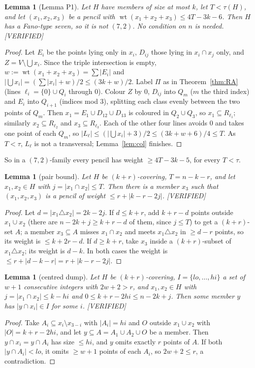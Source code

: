 \documentclass[11pt]{article}
\newtheorem{lemma}[theorem]{Lemma}
\theoremstyle{definition}
\newcommand{\st}[1]{\textsf{\small[#1]}}
\newcommand{\wt}{\operatorname{wt}}
\begin{document}
\begin{lemma}[Lemma P1]\label{lem:P1}
Let $H$ have members of size at most $k$, let $T<\tau(H)$, and let $(x_1,x_2,x_3)$ be a pencil with
$\wt(x_1+x_2+x_3)\le4T-3k-6$. Then $H$ has a Fano-type seven, so it is not $(7,2)$. No condition on $n$ is needed.
\st{VERIFIED}
\end{lemma}
\begin{proof}
Let $E_i$ be the points lying only in $x_i$, $D_{ij}$ those lying in $x_i\cap x_j$ only, and $Z=V\setminus\bigcup x_i$.
Since the triple intersection is empty, $w:=\wt(x_1+x_2+x_3)=\sum|E_i|$ and
$|\bigcup x_i|=(\sum|x_i|+w)/2\le(3k+w)/2$. Label $\Pi$ as in Theorem~\ref{thm:RA} (lines $\ell_i=\{0\}\cup Q_i$
through $0$). Colour $Z$ by $0$, $D_{ij}$ into $Q_m$ ($m$ the third index) and $E_i$ into $Q_{i+1}$ (indices mod $3$),
splitting each class evenly between the two points of $Q_m$. Then $x_1=E_1\cup D_{12}\cup D_{13}$ is coloured in
$Q_2\cup Q_3$, so $x_1\subseteq R_{\ell_1}$; similarly $x_2\subseteq R_{\ell_2}$ and $x_3\subseteq R_{\ell_3}$. Each of the
other four lines avoids $0$ and takes one point of each $Q_m$, so
$|L_\ell|\le(|\bigcup x_i|+3)/2\le(3k+w+6)/4\le T$. As $T<\tau$, $L_\ell$ is not a transversal; Lemma~\ref{lem:col}
finishes.
\end{proof}
So in a $(7,2)$-family every pencil has weight $\ge4T-3k-5$, for every $T<\tau$.

\begin{lemma}[pair bound]\label{lem:pair}
Let $H$ be $(k+r)$-covering, $T=n-k-r$, and let $x_1,x_2\in H$ with $j=|x_1\cap x_2|\le T$. Then there is a member $x_3$
such that $(x_1,x_2,x_3)$ is a pencil of weight $\le r+|k-r-2j|$. \st{VERIFIED}
\end{lemma}
\begin{proof}
Let $d=|x_1\triangle x_2|=2k-2j$. If $d\le k+r$, add $k+r-d$ points outside $x_1\cup x_2$ (there are $n-2k+j\ge k+r-d$
of them, since $j\le T$) to get a $(k+r)$-set $A$; a member $x_3\subseteq A$ misses $x_1\cap x_2$ and meets
$x_1\triangle x_2$ in $\ge d-r$ points, so its weight is $\le k+2r-d$. If $d\ge k+r$, take $x_3$ inside a $(k+r)$-subset
of $x_1\triangle x_2$; its weight is $d-k$. In both cases the weight is $\le r+|d-k-r|=r+|k-r-2j|$.
\end{proof}

\begin{lemma}[centred dump]\label{lem:dump}
Let $H$ be $(k+r)$-covering, $I=\{lo,\dots,hi\}$ a set of $w+1$ consecutive integers with $2w+2>r$, and $x_1,x_2\in H$
with $j=|x_1\cap x_2|\le k-hi$ and $0\le k+r-2hi\le n-2k+j$. Then some member $y$ has $|y\cap x_i|\in I$ for some $i$.
\st{VERIFIED}
\end{lemma}
\begin{proof}
Take $A_i\subseteq x_i\setminus x_{3-i}$ with $|A_i|=hi$ and $O$ outside $x_1\cup x_2$ with $|O|=k+r-2hi$, and let
$y\subseteq A=A_1\cup A_2\cup O$ be a member. Then $y\cap x_i=y\cap A_i$ has size $\le hi$, and $y$ omits exactly $r$
points of $A$. If both $|y\cap A_i|<lo$, it omits $\ge w+1$ points of each $A_i$, so $2w+2\le r$, a contradiction.
\end{proof}
\end{document}

